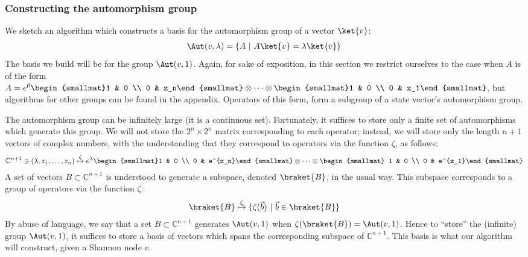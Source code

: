 \subsubsection{Constructing the automorphism group}
\label{sec:construct-automorphism-group}

We sketch an algorithm which constructs a basis for the automorphism group of a vector $\ket{v}$:
\begin{align}
\Aut(v,\lambda)=\{A\ |\ A\ket{v}=\lambda\ket{v}\}
\end{align}
The basis we build will be for the group $\Aut(v,1)$.
Again, for sake of exposition, in this section we restrict ourselves to the case when $A$ is of the form $A=e^\theta\begin{smallmat}1 & 0 \\ 0 & z_n\end{smallmat} \otimes\cdots\otimes \begin{smallmat}1 & 0 \\ 0 & z_1\end{smallmat}$, but algorithms for other groups can be found in the appendix.
Operators of this form, form a subgroup of a state vector's automorphism group.

The automorphism group can be infinitely large (it is a continuous set).
Fortunately, it suffices to store only a finite set of automorphisms which generate this group.
We will not store the $2^n\times 2^n$ matrix corresponding to each operator; instead, we will store only the length $n+1$ vectors of complex numbers, with the understanding that they correspond to operators via the function $\zeta$, as follows:
\begin{align}
\mathbb C^{n+1}\ni (\lambda,z_1,\ldots, z_n)\overset{\zeta}{\mapsto}e^\lambda \begin{smallmat}1 & 0 \\ 0 & e^{z_n}\end{smallmat} \otimes\cdots\otimes \begin{smallmat} 1 & 0 \\ 0 & e^{z_1}\end{smallmat}
\end{align}
A set of vectors $B\subset \mathbb C^{n+1}$ is understood to generate a subspace, denoted $\braket{B}$, in the usual way.
This subspace corresponds to a group of operators via the function $\zeta$:
\begin{align}
\braket{B} \overset{\zeta}{\mapsto} \{\zeta(\vec b) \ |\ \vec b\in \braket{B}\}
\end{align}
By abuse of language, we say that a set $B\subset \mathbb C^{n+1}$ generates $\Aut(v,1)$ when $\zeta(\braket{B})=\Aut(v,1)$.
Hence to ``store'' the (infinite) group $\Aut(v,1)$, it suffices to store a basis of vectors which spans the corresponding subspace of $\mathbb C^{n+1}$.
This basis is what our algorithm will construct, given a Shannon node $v$.

